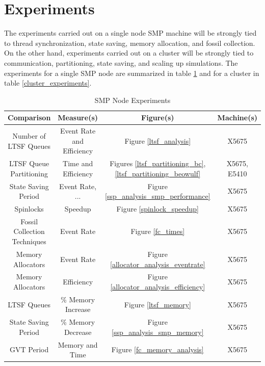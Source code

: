 \documentclass[11pt]{book}
\begin{document}
\section{Experiments}

The experiments carried out on a single node SMP machine will be strongly tied to thread
synchronization, state saving, memory allocation, and fossil collection.  On the other hand,
experiments carried out on a cluster will be strongly tied to communication, partitioning, state
saving, and scaling up simulations.  The experiments for a single SMP node are summarized in table
\ref{smp_experiments} and for a cluster in table \ref{cluster_experiments}.

\begin{table}[H]
    \centering
    \begin{tabular}{| c | c | c | c |}
        \hline
        \textbf{Comparison} & \textbf{Measure(s)}  & \textbf{Figure(s)}   & \textbf{Machine(s)}  \\
        \hline
        Number of LTSF Queues & Event Rate and Efficiency   & Figure \ref{ltsf_analysis}    & X5675             \\
        \hline
        LTSF Queue Partitioning & Time and Efficiency    & Figures \ref{ltsf_partitioning_bc},
            \ref{ltsf_partitioning_beowulf}    & X5675, E5410 \\
        \hline
        State Saving Period & Event Rate, ...  & Figure \ref{ssp_analysis_smp_performance} & X5675 \\
        \hline
        Spinlocks & Speedup  & Figure \ref{spinlock_speedup} & X5675 \\
        \hline
        Fossil Collection Techniques & Event Rate    & Figure \ref{fc_times} & X5675 \\
        \hline
        Memory Allocators & Event Rate   & Figure \ref{allocator_analysis_eventrate} & X5675 \\
        \hline
        Memory Allocators & Efficiency   & Figure \ref{allocator_analysis_efficiency}    & X5675 \\
        \hline
        LTSF Queues & \% Memory Increase & Figure \ref{ltsf_memory}  & X5675 \\
        \hline
        State Saving Period & \% Memory Decrease & Figure \ref{ssp_analysis_smp_memory}  & X5675 \\
        \hline
        GVT Period & Memory and Time & Figure \ref{fc_memory_analysis}   & X5675 \\
        \hline
    \end{tabular}
    \caption{SMP Node Experiments}\label{smp_experiments}
\end{table}
\end{document}
